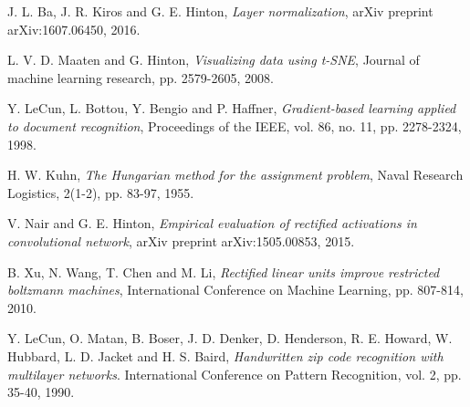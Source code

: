 \documentclass[conference]{IEEEtran}
\begin{document}
\begin{thebibliography}{1}
J. L. Ba, J. R. Kiros and G. E. Hinton, \emph{Layer normalization}, arXiv preprint arXiv:1607.06450, 2016.

L. V. D. Maaten and G. Hinton, \emph{Visualizing data using t-SNE}, Journal of machine learning research, pp. 2579-2605, 2008.

Y. LeCun, L. Bottou, Y. Bengio and P. Haffner, \emph{Gradient-based learning applied to document recognition}, Proceedings of the IEEE, vol. 86, no. 11, pp. 2278-2324, 1998.

H. W. Kuhn, \emph{The Hungarian method for the assignment problem}, Naval Research Logistics, 2(1-2), pp. 83-97, 1955.

V. Nair and G. E. Hinton, \emph{Empirical evaluation of rectified activations in convolutional network}, arXiv preprint arXiv:1505.00853, 2015.

B. Xu, N. Wang, T. Chen and M. Li, \emph{Rectified linear units improve restricted boltzmann machines}, International Conference on Machine Learning, pp. 807-814, 2010.

Y. LeCun, O. Matan, B. Boser, J. D. Denker, D. Henderson, R. E. Howard, W. Hubbard, L. D. Jacket and H. S. Baird, \emph{Handwritten zip code recognition with multilayer networks}. International Conference on Pattern Recognition, vol. 2, pp. 35-40, 1990.


\end{thebibliography}


\end{document}
